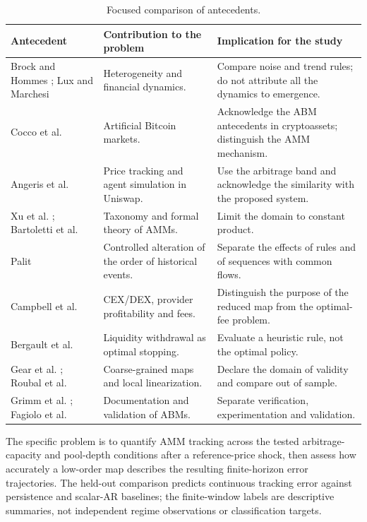 \begin{table}[htbp]
\centering
\caption{Focused comparison of antecedents.}
\label{tab:antecedentes}
\small
\begin{tabularx}{\textwidth}{@{}>{\raggedright\arraybackslash}p{3.3cm} >{\raggedright\arraybackslash}X >{\raggedright\arraybackslash}X@{}}
\toprule
Antecedent & Contribution to the problem & Implication for the study \\
\midrule
Brock and Hommes \cite{brock1998heterogeneous}; Lux and Marchesi \cite{lux1999scaling} & Heterogeneity and financial dynamics. & Compare noise and trend rules; do not attribute all the dynamics to emergence. \\
Cocco et al. \cite{cocco2017artificial,cocco2019agent} & Artificial Bitcoin markets. & Acknowledge the ABM antecedents in cryptoassets; distinguish the AMM mechanism. \\
Angeris et al. \cite{angeris2020uniswap} & Price tracking and agent simulation in Uniswap. & Use the arbitrage band and acknowledge the similarity with the proposed system. \\
Xu et al. \cite{xu2023sok}; Bartoletti et al. \cite{bartoletti2022theory} & Taxonomy and formal theory of AMMs. & Limit the domain to constant product. \\
Palit \cite{palit2022shuffled} & Controlled alteration of the order of historical events. & Separate the effects of rules and of sequences with common flows. \\
Campbell et al. \cite{campbell2025optimal} & CEX/DEX, provider profitability and fees. & Distinguish the purpose of the reduced map from the optimal-fee problem. \\
Bergault et al. \cite{bergault2025exit} & Liquidity withdrawal as optimal stopping. & Evaluate a heuristic rule, not the optimal policy. \\
Gear et al. \cite{gear2003equationfree}; Roubal et al. \cite{roubal2010linearization} & Coarse-grained maps and local linearization. & Declare the domain of validity and compare out of sample. \\
Grimm et al. \cite{grimm2020odd}; Fagiolo et al. \cite{fagiolo2007critical} & Documentation and validation of ABMs. & Separate verification, experimentation and validation. \\
\bottomrule
\end{tabularx}
\end{table}

The specific problem is to quantify AMM tracking across the tested arbitrage-capacity and pool-depth conditions after a reference-price shock, then assess how accurately a low-order map describes the resulting finite-horizon error trajectories. The held-out comparison predicts continuous tracking error against persistence and scalar-AR baselines; the finite-window labels are descriptive summaries, not independent regime observations or classification targets.

